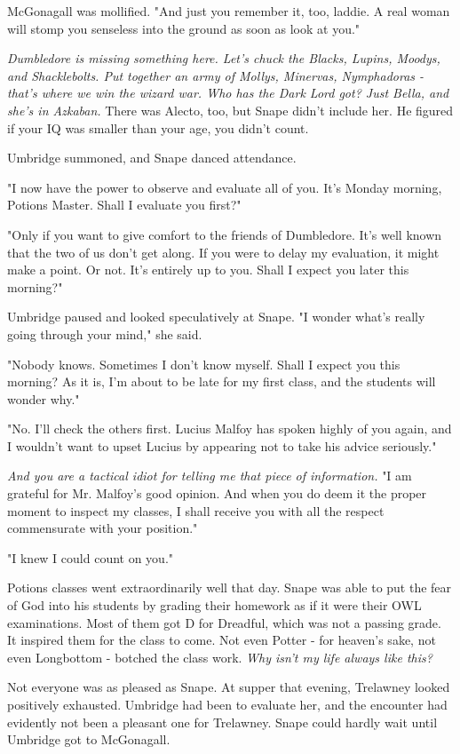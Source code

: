 McGonagall was mollified. "And just you remember it, too, laddie. A real woman will stomp you senseless into the ground as soon as look at you."

\emph{Dumbledore is missing something here. Let's chuck the Blacks, Lupins, Moodys, and Shacklebolts. Put together an army of Mollys, Minervas, Nymphadoras - that's where we win the wizard war. Who has the Dark Lord got? Just Bella, and she's in Azkaban.} There was Alecto, too, but Snape didn't include her. He figured if your IQ was smaller than your age, you didn't count.

Umbridge summoned, and Snape danced attendance.

"I now have the power to observe and evaluate all of you. It's Monday morning, Potions Master. Shall I evaluate you first?"

"Only if you want to give comfort to the friends of Dumbledore. It's well known that the two of us don't get along. If you were to delay my evaluation, it might make a point. Or not. It's entirely up to you. Shall I expect you later this morning?"

Umbridge paused and looked speculatively at Snape. "I wonder what's really going through your mind," she said.

"Nobody knows. Sometimes I don't know myself. Shall I expect you this morning? As it is, I'm about to be late for my first class, and the students will wonder why."

"No. I'll check the others first. Lucius Malfoy has spoken highly of you again, and I wouldn't want to upset Lucius by appearing not to take his advice seriously."

\emph{And you are a tactical idiot for telling me that piece of information.} "I am grateful for Mr. Malfoy's good opinion. And when you do deem it the proper moment to inspect my classes, I shall receive you with all the respect commensurate with your position."

"I knew I could count on you."

Potions classes went extraordinarily well that day. Snape was able to put the fear of God into his students by grading their homework as if it were their OWL examinations. Most of them got D for Dreadful, which was not a passing grade. It inspired them for the class to come. Not even Potter - for heaven's sake, not even Longbottom - botched the class work. \emph{Why isn't my life always like this?}

Not everyone was as pleased as Snape. At supper that evening, Trelawney looked positively exhausted. Umbridge had been to evaluate her, and the encounter had evidently not been a pleasant one for Trelawney. Snape could hardly wait until Umbridge got to McGonagall.

